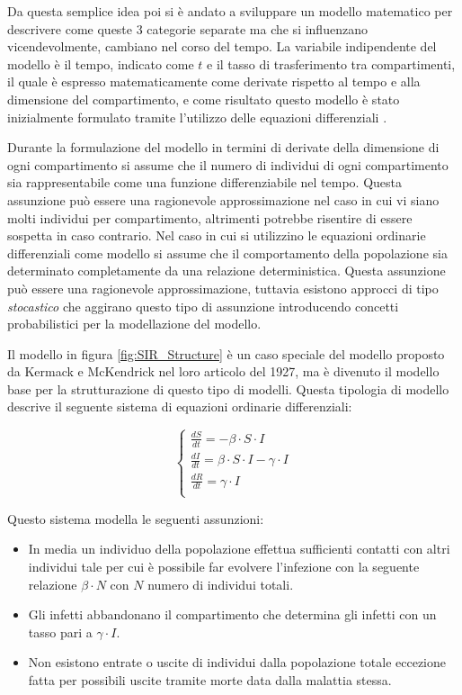 Da questa semplice idea poi si è andato a sviluppare un modello
matematico per descrivere come queste 3 categorie separate ma 
che si influenzano vicendevolmente, cambiano nel corso del tempo.
La variabile indipendente del modello è il tempo, indicato come $t$ e il 
tasso di trasferimento tra compartimenti, il quale è espresso matematicamente come 
derivate rispetto al tempo e alla dimensione del compartimento, e come risultato questo 
modello è stato inizialmente formulato tramite l'utilizzo delle equazioni differenziali
\cite{Brauer2008}. 

Durante la formulazione del modello in termini di derivate della dimensione di ogni compartimento
si assume che il numero di individui di ogni compartimento sia rappresentabile come una funzione 
differenziabile nel tempo. Questa assunzione può essere una ragionevole approssimazione nel caso 
in cui vi siano molti individui per compartimento, altrimenti potrebbe risentire di essere sospetta
in caso contrario. Nel caso in cui si utilizzino le equazioni ordinarie differenziali come modello 
si assume che il comportamento della popolazione sia determinato completamente da una relazione deterministica. 
Questa assunzione può essere una ragionevole approssimazione, tuttavia esistono approcci di tipo 
\emph{stocastico} che aggirano questo tipo di assunzione introducendo concetti probabilistici per
la modellazione del modello.

Il modello in figura \ref{fig:SIR_Structure} è un caso speciale del modello proposto da Kermack e McKendrick 
nel loro articolo del 1927, ma è divenuto il modello base per la strutturazione di questo tipo di modelli.
Questa tipologia di modello descrive il seguente sistema di equazioni ordinarie differenziali:

\[
    \left\{
    \begin{array}{ll}
        \frac{dS}{dt} = -\beta \cdot S \cdot I\\
        \frac{dI}{dt} = \beta \cdot S \cdot I - \gamma \cdot I\\
        \frac{dR}{dt} = \gamma \cdot I\\
    \end{array}
    \right.
\]

Questo sistema modella le seguenti assunzioni: 
\begin{itemize}
    \item In media un individuo della popolazione effettua sufficienti contatti con altri individui tale per cui 
    è possibile far evolvere l'infezione con la seguente relazione $\beta \cdot N$ con $N$ numero di individui totali. 
    \item Gli infetti abbandonano il compartimento che determina gli infetti con un tasso pari a $\gamma \cdot I$.
    \item Non esistono entrate o uscite di individui dalla popolazione totale eccezione fatta per possibili uscite tramite morte
    data dalla malattia stessa.
\end{itemize}

